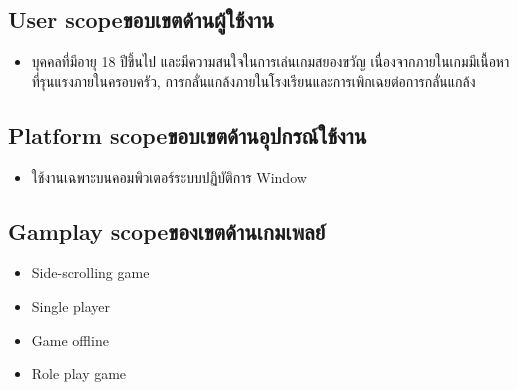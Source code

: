 \subsection{\ifenglish User scope\else ขอบเขตด้านผู้ใช้งาน\fi}
\begin{itemize}
    \item บุคคลที่มีอายุ 18 ปีขึ้นไป และมีความสนใจในการเล่นเกมสยองขวัญ เนื่องจากภายในเกมมีเนื้อหาที่รุนแรงภายในครอบครัว, การกลั่นแกล้งภายในโรงเรียนและการเพิกเฉยต่อการกลั่นแกล้ง
\end{itemize}

\subsection{\ifenglish Platform scope\else ขอบเขตด้านอุปกรณ์ใช้งาน\fi}
\begin{itemize}
    \item ใช้งานเฉพาะบนคอมพิวเตอร์ระบบปฏิบัติการ Window
\end{itemize}

\subsection{\ifenglish Gamplay scope\else ของเขตด้านเกมเพลย์\fi}
\begin{itemize}
    \item Side-scrolling game
    \item Single player
    \item Game offline
    \item Role play game
\end{itemize}



